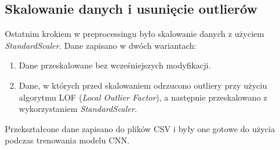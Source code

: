 \documentclass[12pt]{article}
\begin{document}
\subsection{Skalowanie danych i usunięcie outlierów}

Ostatnim krokiem w preprocessingu było skalowanie danych z użyciem \emph{StandardScaler}. Dane zapisano w dwóch wariantach:
\begin{enumerate}
    \item Dane przeskalowane bez wcześniejszych modyfikacji.
    \item Dane, w których przed skalowaniem odrzucono outliery przy użyciu algorytmu LOF (\emph{Local Outlier Factor}), a następnie przeskalowano z wykorzystaniem \emph{StandardScaler}.
\end{enumerate}

Przekształcone dane zapisano do plików CSV i były one gotowe do użycia podczas trenowania modelu CNN.
\end{document}
